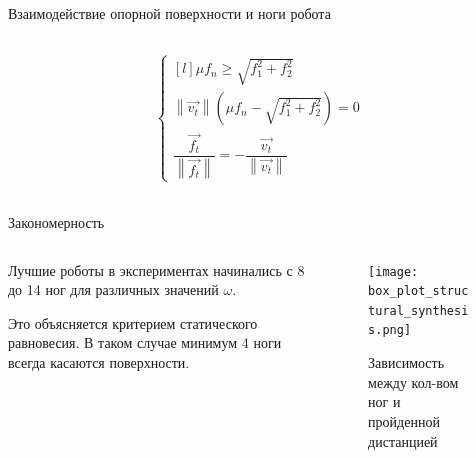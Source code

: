 \begin{frame}[t]{Взаимодействие опорной поверхности и ноги робота}
\begin{columns}[T,onlytextwidth]
\begin{column}{0.29\textwidth}
\begin{align}
                \left\{\begin{matrix*}[l]
                           \mu f_n \geqslant \sqrt{f_1^2 + f_2^2}\\
                           \left\lVert \vec{v_t}\right\rVert (\mu f_n - \sqrt{f_1^2 + f_2^2}) = 0\\
                           \dfrac{\vec{f_t}}{\left\lVert \vec{f_t}\right\rVert } = - \dfrac{\vec{v_t}}{\left\lVert \vec{v_t}\right\rVert }
                       \end{matrix*}\right.
            \end{align}
        \end{column}
    \end{columns}
\end{frame}

\begin{frame}[t]{Закономерность}

    \begin{columns}[T,onlytextwidth]
        \begin{column}{0.49\textwidth}
            Лучшие роботы в экспериментах начинались с 8 до 14 ног для различных значений $\omega$.

            Это объясняется критерием статического равновесия. В таком случае минимум 4 ноги всегда касаются поверхности.
        \end{column}
        \begin{column}{0.49\textwidth}
            \begin{figure}[H]
                \centering\texttt{[image: box\_plot\_structural\_synthesis.png]}
                \caption*{Зависимость между кол-вом ног и пройденной дистанцией}
            \end{figure}
        \end{column}
    \end{columns}
\end{frame}


